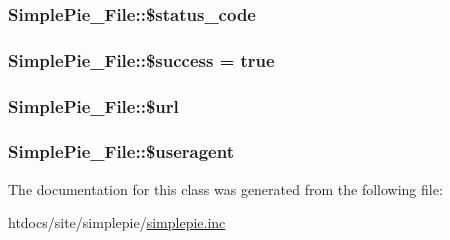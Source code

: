 \hypertarget{class_simple_pie___file_a143626f83244c8e9957cf316beff8f9d}{
\subsubsection[{\$status\-\_\-code}]{\setlength{\rightskip}{0pt plus 5cm}Simple\-Pie\-\_\-\-File\-::\$status\-\_\-code}}\label{class_simple_pie___file_a143626f83244c8e9957cf316beff8f9d}
\hypertarget{class_simple_pie___file_af05c48ad88b4a050c310b32527284f52}{
\subsubsection[{\$success}]{\setlength{\rightskip}{0pt plus 5cm}Simple\-Pie\-\_\-\-File\-::\$success = true}}\label{class_simple_pie___file_af05c48ad88b4a050c310b32527284f52}
\hypertarget{class_simple_pie___file_ac6ece4ef8c713f42fb22b105d52153c6}{
\subsubsection[{\$url}]{\setlength{\rightskip}{0pt plus 5cm}Simple\-Pie\-\_\-\-File\-::\$url}}\label{class_simple_pie___file_ac6ece4ef8c713f42fb22b105d52153c6}
\hypertarget{class_simple_pie___file_a6b4c8902288045d12d5a3ee9603832a6}{
\subsubsection[{\$useragent}]{\setlength{\rightskip}{0pt plus 5cm}Simple\-Pie\-\_\-\-File\-::\$useragent}}\label{class_simple_pie___file_a6b4c8902288045d12d5a3ee9603832a6}


The documentation for this class was generated from the following file\-:\begin{DoxyCompactItemize}
\item 
htdocs/site/simplepie/\hyperlink{simplepie_8inc}{simplepie.\-inc}\end{DoxyCompactItemize}
